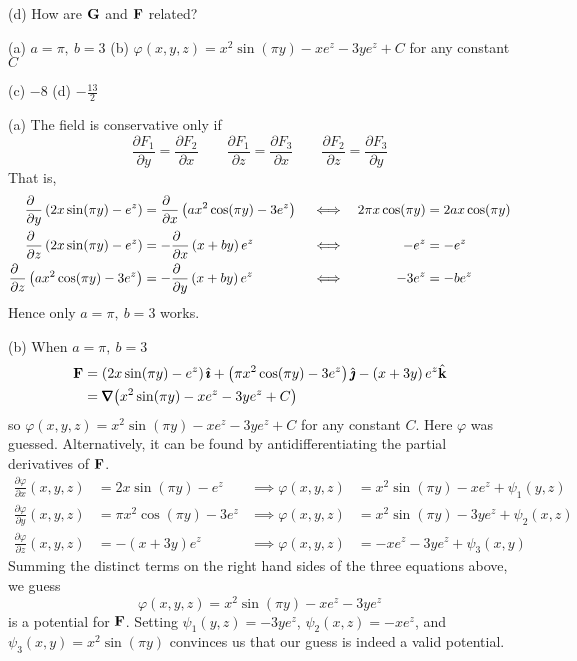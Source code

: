 \begin{hint} 
(d) How are $\mathbf{G}$ and $\mathbf{F}$ related?
\end{hint}

\begin{answer}
(a) $a=\pi,\ b=3$\qquad
(b) $\varphi(x,y,z)=x^2\sin(\pi y)-xe^z-3ye^z+C$ for any constant $C$

(c) $-8$\qquad
(d) $-\frac{13}{2}$
\end{answer}

\begin{solution}  (a)
The field is conservative only if
$$
\frac{\partial F_1}{\partial y}=\frac{\partial F_2}{\partial x}\qquad
\frac{\partial F_1}{\partial z}=\frac{\partial F_3}{\partial x}\qquad
\frac{\partial F_2}{\partial z}=\frac{\partial F_3}{\partial y}
$$
That is,
\begin{align*}
\frac{\partial\hfill}{\partial y}\left(2x\sin(\pi y)-e^z\right)
&=\frac{\partial\hfill}{\partial x}\left(ax^2\cos(\pi y)-3e^z\right) &
&\iff &
2\pi x\cos(\pi y) & =2a x\cos(\pi y)
\\
%
\frac{\partial\hfill}{\partial z}\left(2x\sin(\pi y)-e^z\right)
&=-\frac{\partial\hfill}{\partial x}\left(x+by\right)e^z &
&\iff &
-e^z & =-e^z
\\
%
\frac{\partial\hfill}{\partial z}\left(ax^2\cos(\pi y)-3e^z\right)
&=-\frac{\partial\hfill}{\partial y}\left(x+by\right)e^z &
&\iff &
-3e^z & =-be^z
\end{align*}
Hence only $a=\pi,\ b=3$ works.

(b) When $a=\pi,\ b=3$
\begin{align*}
\vF&=\left(2x\sin(\pi y)-e^z\right)\hi
+\left(\pi x^2\cos(\pi y)-3e^z\right)\hj
-\left(x+3y\right)e^z\hk\\
&=\vnabla\big( x^2\sin(\pi y)-xe^z-3ye^z+C\big)
\end{align*}
so $\varphi(x,y,z)=x^2\sin(\pi y)-xe^z-3ye^z+C$ for any constant $C$.
Here $\varphi$ was guessed. Alternatively, it can be found 
by antidifferentiating the partial derivatives of $\mathbf{F}$.
\begin{align*}
\frac{\partial \varphi}{\partial x}(x,y,z) &= 2x\sin(\pi y)-e^z &\implies \varphi(x,y,z)&=x^2\sin(\pi y)-xe^z+\psi_1(y,z)\\
\frac{\partial \varphi}{\partial y}(x,y,z) &= \pi x^2\cos(\pi y)-3e^z &\implies \varphi(x,y,z)&=x^2\sin(\pi y)-3ye^z+\psi_2(x,z)\\
\frac{\partial \varphi}{\partial z}(x,y,z) &= -(x+3y)e^z & \implies \varphi(x,y,z)&=-xe^z-3ye^z+\psi_3(x,y)
\end{align*}
Summing the distinct terms on the right hand sides of the three equations
above, we guess
\[\varphi(x,y,z) = x^2\sin(\pi y)-xe^z-3ye^z\] is a potential for $\mathbf{F}$. Setting $\psi_1(y,z)=-3ye^z$, $\psi_2(x,z)=-xe^z$, and $\psi_3(x,y)=x^2\sin(\pi y)$ convinces us that our guess is indeed a valid potential.


\end{solution}
